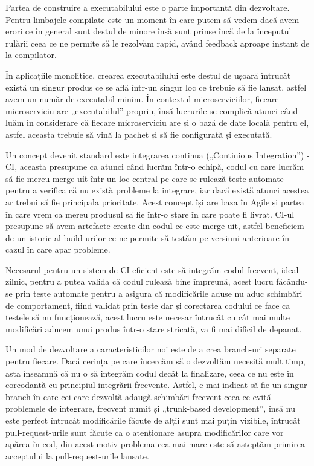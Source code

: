 Partea de construire a executabilului este o parte importantă din dezvoltare. Pentru limbajele
compilate este un moment în care putem să vedem dacă avem erori ce în general sunt destul de minore
însă sunt prinse încă de la începutul rulării ceea ce ne permite să le rezolvăm rapid, având
feedback aproape instant de la compilator.

În aplicațiile monolitice, crearea executabilului este destul de ușoară întrucât există 
un singur produs ce se află într-un singur loc ce trebuie să fie lansat, 
astfel avem un număr de executabil minim. În contextul microserviciilor, 
fiecare microserviciu are „executabilul” propriu, însă lucrurile se complică 
atunci când luăm in considerare că fiecare microserviciu are și o bază de date locală pentru el,
astfel aceasta trebuie să vină la pachet și să fie configurată și executată.

Un concept devenit standard este integrarea continua („Continious Integration”) - CI, aceasta
presupune ca atunci când lucrăm într-o echipă, codul cu care lucrăm să fie mereu merge-uit
într-un loc central pe care se rulează teste automate pentru a verifica că nu există probleme
la integrare, iar dacă există atunci acestea ar trebui să fie principala prioritate. Acest 
concept își are baza în Agile și partea în care vrem ca mereu produsul să fie într-o stare
în care poate fi livrat. CI-ul presupune să avem artefacte create din codul ce este merge-uit,
astfel beneficiem de un istoric al build-urilor ce ne permite să testăm pe versiuni anterioare
în cazul în care apar probleme.

Necesarul pentru un sistem de CI eficient este să integrăm codul frecvent, ideal zilnic,
pentru a putea valida că codul rulează bine împreună, acest lucru făcându-se prin teste automate
pentru a asigura că modificările aduse nu aduc schimbări de comportament, fiind validat 
prin teste dar și corectarea codului ce face ca testele să nu funcționează, acest lucru este necesar
întrucât cu cât mai multe modificări aducem unui produs într-o stare stricată, va fi mai dificil 
de depanat.

Un mod de dezvoltare a caracteristicilor noi este de a crea branch-uri separate pentru fiecare.
Dacă cerința pe care încercăm să o dezvoltăm necesită mult timp, asta înseamnă că nu o să integrăm
codul decât la finalizare, ceea ce nu este în corcodanță cu principiul integrării frecvente.
Astfel, e mai indicat să fie un singur branch în care cei care dezvoltă adaugă schimbări frecvent
ceea ce evită problemele de integrare, frecvent numit și „trunk-based development”, însă nu este
perfect întrucât modificările făcute de alții sunt mai puțin vizibile, întrucât pull-request-urile sunt 
făcute ca o atenționare asupra modificărilor care vor apărea în cod, din acest motiv
problema cea mai mare este să așteptăm primirea acceptului la pull-request-urile lansate.

